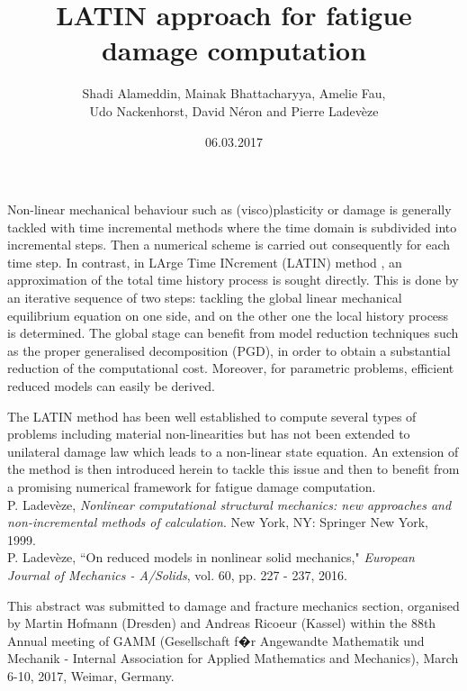 \documentclass[]{article}
\begin{document}
	\date{06.03.2017}
\title{LATIN approach for fatigue damage computation}
\author{Shadi Alameddin, Mainak Bhattacharyya, Amelie Fau,\\ Udo Nackenhorst, David N{\'e}ron and Pierre Ladev{\`e}ze}
\maketitle


Non-linear mechanical behaviour such as (visco)plasticity or damage is generally tackled with time incremental methods where the time domain is subdivided into incremental steps. Then a numerical scheme is carried out consequently for each time step. In contrast, in LArge Time INcrement (LATIN) method \nolinebreak {[1]}, an approximation of the total time history process is sought directly. This is done by an iterative sequence of two steps: tackling the global linear mechanical equilibrium equation on one side, and on the other one the local history process is determined. The global stage can benefit from model reduction techniques such as the proper generalised decomposition (PGD), in order to obtain a substantial reduction of the computational cost. Moreover, for parametric problems, efficient reduced models can easily be derived. 


The LATIN method has been well established to compute several types of problems including material non-linearities \nolinebreak {[2]} but has not been extended to unilateral damage law which leads to a non-linear state equation. An extension of the method is then introduced herein to tackle this issue and then to benefit from a promising numerical framework for fatigue damage computation.\\[3em]

\noindent [1] P. Ladev{\`e}ze, \textit{Nonlinear computational structural mechanics: new approaches and non-incremental methods of calculation}. New York, NY: Springer New York, 1999.\\

\noindent [2] P. Ladev{\`e}ze, ``On reduced models in nonlinear solid mechanics," \textit{European Journal of Mechanics - A/Solids}, vol. 60, pp. 227 - 237, 2016.\\[6em]



\bigskip

\noindent This abstract was submitted to damage and fracture mechanics section, organised by {\centering Martin Hofmann (Dresden) and Andreas Ricoeur (Kassel)} within the 88th Annual meeting of GAMM (Gesellschaft f�r Angewandte Mathematik und Mechanik - Internal Association for Applied Mathematics and Mechanics),  March 6-10, 2017, Weimar, Germany.\\
\end{document}
